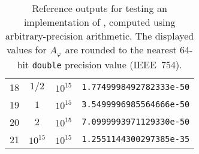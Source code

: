 \begin{table}[htbp]
\begin{tabular}{c|c|c|c}
    18 & $1/2$      & $10^{15}$  & \texttt{1.7749998492782333e-50} \\
    19 & $1$        & $10^{15}$  & \texttt{3.5499996985564666e-50} \\
    20 & $2$        & $10^{15}$  & \texttt{7.0999993971129330e-50} \\
    21 & $10^{15}$  & $10^{15}$  & \texttt{1.2551144300297385e-35}
  \end{tabular}
  \caption{Reference outputs for testing an implementation of , computed using arbitrary-precision arithmetic.
           The displayed values for $A_\varphi$ are rounded to the nearest 64-bit \texttt{double} precision value (IEEE~754).}
  \label{tab:ref_cylWireLoop}
\end{table}
